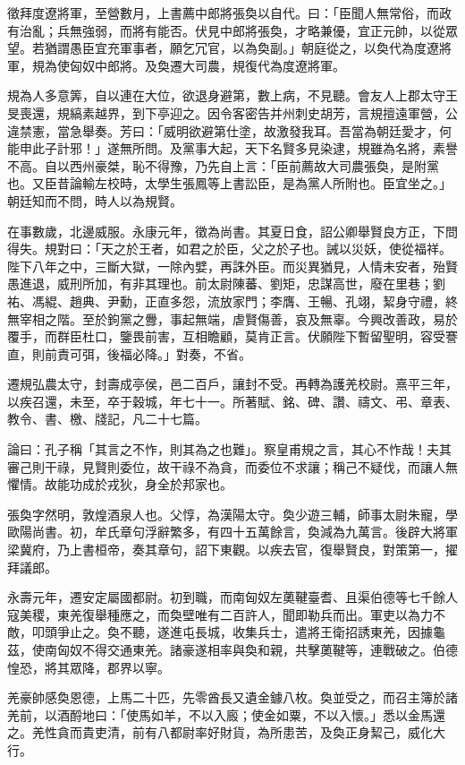 \begin{pinyinscope}
徵拜度遼將軍，至營數月，上書薦中郎將張奐以自代。曰：「臣聞人無常俗，而政有治亂；兵無強弱，而將有能否。伏見中郎將張奐，才略兼優，宜正元帥，以從眾望。若猶謂愚臣宜充軍事者，願乞冗官，以為奐副。」朝庭從之，以奐代為度遼將軍，規為使匈奴中郎將。及奐遷大司農，規復代為度遼將軍。

規為人多意筭，自以連在大位，欲退身避第，數上病，不見聽。會友人上郡太守王旻喪還，規縞素越界，到下亭迎之。因令客密告并州刺史胡芳，言規擅遠軍營，公違禁憲，當急舉奏。芳曰：「威明欲避第仕塗，故激發我耳。吾當為朝廷愛才，何能申此子計邪！」遂無所問。及黨事大起，天下名賢多見染逮，規雖為名將，素譽不高。自以西州豪桀，恥不得豫，乃先自上言：「臣前薦故大司農張奐，是附黨也。又臣昔論輸左校時，太學生張鳳等上書訟臣，是為黨人所附也。臣宜坐之。」朝廷知而不問，時人以為規賢。

在事數歲，北邊威服。永康元年，徵為尚書。其夏日食，詔公卿舉賢良方正，下問得失。規對曰：「天之於王者，如君之於臣，父之於子也。誡以災妖，使從福祥。陛下八年之中，三斷大獄，一除內嬖，再誅外臣。而災異猶見，人情未安者，殆賢愚進退，威刑所加，有非其理也。前太尉陳蕃、劉矩，忠謀高世，廢在里巷；劉祐、馮緄、趙典、尹勳，正直多怨，流放家門；李膺、王暢、孔翊，絜身守禮，終無宰相之階。至於鉤黨之釁，事起無端，虐賢傷善，哀及無辜。今興改善政，易於覆手，而群臣杜口，鑒畏前害，互相瞻顧，莫肯正言。伏願陛下暫留聖明，容受謇直，則前責可弭，後福必降。」對奏，不省。

遷規弘農太守，封壽成亭侯，邑二百戶，讓封不受。再轉為護羌校尉。熹平三年，以疾召還，未至，卒于穀城，年七十一。所著賦、銘、碑、讚、禱文、弔、章表、教令、書、檄、牋記，凡二十七篇。

論曰：孔子稱「其言之不怍，則其為之也難」。察皇甫規之言，其心不怍哉！夫其審己則干祿，見賢則委位，故干祿不為貪，而委位不求讓；稱己不疑伐，而讓人無懼情。故能功成於戎狄，身全於邦家也。

張奐字然明，敦煌酒泉人也。父惇，為漢陽太守。奐少遊三輔，師事太尉朱寵，學歐陽尚書。初，牟氏章句浮辭繁多，有四十五萬餘言，奐減為九萬言。後辟大將軍梁冀府，乃上書桓帝，奏其章句，詔下東觀。以疾去官，復舉賢良，對策第一，擢拜議郎。

永壽元年，遷安定屬國都尉。初到職，而南匈奴左薁鞬臺耆、且渠伯德等七千餘人寇美稷，東羌復舉種應之，而奐壁唯有二百許人，聞即勒兵而出。軍吏以為力不敵，叩頭爭止之。奐不聽，遂進屯長城，收集兵士，遣將王衛招誘東羌，因據龜茲，使南匈奴不得交通東羌。諸豪遂相率與奐和親，共擊薁鞬等，連戰破之。伯德惶恐，將其眾降，郡界以寧。

羌豪帥感奐恩德，上馬二十匹，先零酋長又遺金鐻八枚。奐並受之，而召主簿於諸羌前，以酒酹地曰：「使馬如羊，不以入廄；使金如粟，不以入懷。」悉以金馬還之。羌性貪而貴吏清，前有八都尉率好財貨，為所患苦，及奐正身絜己，威化大行。


\end{pinyinscope}
